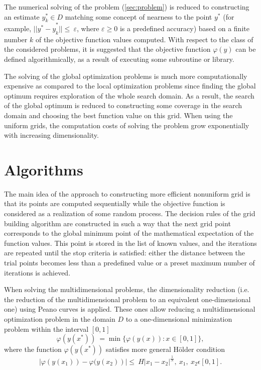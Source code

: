 \documentclass{cmi}
\begin{document}
The numerical solving of the problem (\ref{sec:problem})  is reduced to constructing an estimate  $ y_k^\ast\in D$ matching some concept of nearness to the point $y^\ast$ (for example,  ${||y^\ast-y}_k^\ast||\le\ \varepsilon$, where $\varepsilon\geq0$ is a predefined accuracy) based on a  finite number $k$ of the objective function values computed. With respect to the class of the considered problems, it is suggested that the objective function $\varphi(y)$ can be defined algorithmically, as a result of executing some subroutine or library.

The solving of the global optimization problems is much more computationally expensive as compared to the local optimization problems since finding the global optimum requires exploration of the whole search domain. As a result, the search of the  global optimum is reduced to constructing some coverage in the search domain and choosing the best function value on this grid. When using the uniform grids, the computation costs of solving the  problem grow exponentially with increasing dimensionality.



\section{Algorithms}\label{SecA}

The main idea of the approach to constructing more efficient nonuniform grid is that its points are  computed sequentially while the objective function is considered as a realization of some random process. The decision rules of the grid building algorithm are constructed in such a way that the next  grid point corresponds to the global minimum point of the mathematical expectation of the function  values. This point is stored in the list of known values, and the iterations are repeated until the stop criteria is satisfied: either the distance between the trial points becomes less than a  predefined value or a preset maximum number of iterations is achieved.

When solving the multidimensional problems, the dimensionality reduction (i.e. the reduction of the  multidimensional problem to an equivalent one-dimensional one) using Peano curves is applied. These  ones allow reducing a multidimensional optimization problem in the domain $D$  to a one-dimensional  minimization problem within the interval $[0, 1]$
\begin{displaymath}
	\varphi(y(x^\ast))\ =\min\{\varphi(y(x)): x\in [0,1]\},
\end{displaymath}
where the function $\varphi(y(x^\ast))$ satisfies more general H{\"o}lder condition
\begin{displaymath}
	\left|\varphi (y \left(x_1\right))- \varphi (y \left(x_2\right)\right )|\le\ H\left|x_1-x_2\right|^\frac{1}{N},\ x_1,\ x_2\epsilon[0,1].
\end{displaymath} 
\end{document}
